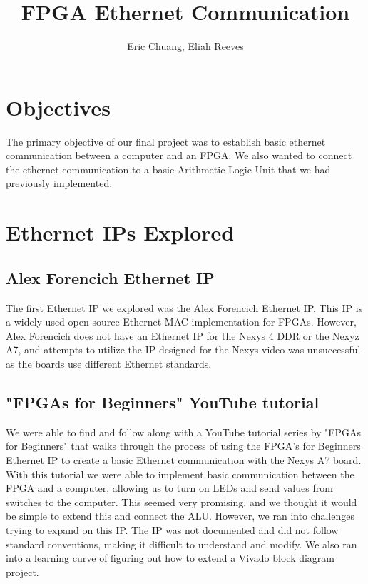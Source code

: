 \documentclass{article}
\title{FPGA Ethernet Communication}
\author{{Eric Chuang, Eliah Reeves}}
\date{\vspace{-5ex}} %
\begin{document}
\maketitle
\thispagestyle{firstpage}
\section*{Objectives}

The primary objective of our final project was to establish basic ethernet communication between a computer and an FPGA. We also wanted to connect the ethernet communication to a basic Arithmetic Logic Unit that we had previously implemented.

\section*{Ethernet IPs Explored}

\subsection*{Alex Forencich Ethernet IP}

The first Ethernet IP we explored was the Alex Forencich Ethernet IP. This IP is a widely used open-source Ethernet MAC implementation for FPGAs. However, Alex Forencich does not have an Ethernet IP for the Nexys 4 DDR or the Nexyz A7, and attempts to utilize the IP designed for the Nexys video was unsuccessful as the boards use different Ethernet standards.

\subsection*{"FPGAs for Beginners" YouTube tutorial}

We were able to find and follow along with a YouTube tutorial series by "FPGAs for Beginners" that walks through the process of using the FPGA's for Beginners Ethernet IP to create a basic Ethernet communication with the Nexys A7 board. With this tutorial we were able to implement basic communication between the FPGA and a computer, allowing us to turn on LEDs and send values from switches to the computer. This seemed very promising, and we thought it would be simple to extend this and connect the ALU. However, we ran into challenges trying to expand on this IP. The IP was not documented and did not follow standard conventions, making it difficult to understand and modify. We also ran into a learning curve of figuring out how to extend a Vivado block diagram project.
\end{document}
